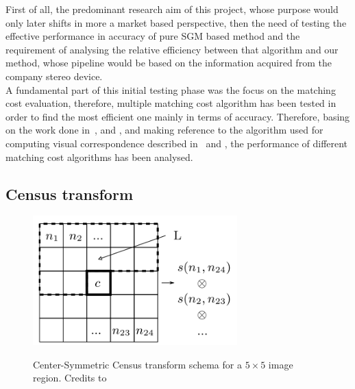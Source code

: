 First of all, the predominant research aim of this project, whose purpose would only later shifts in more a market based perspective, then the need of testing the effective performance in accuracy of pure SGM based method and the requirement of analysing the relative efficiency between that algorithm and our method, whose pipeline would be based on the information acquired from the company stereo device. \\
A fundamental part of this initial testing phase was the focus on the matching cost evaluation, therefore, multiple matching cost algorithm has been tested in order to find the most efficient one mainly in terms of accuracy. 
Therefore, basing on the work done in~\cite{Hirschmuller2007}, \cite{Patil2013} and \cite{Ko2017}, and making reference to the algorithm used for computing visual correspondence described in~\cite{Zabih1994} and \cite{Demetz2013}, the performance of different matching cost algorithms has been analysed.

\subsection{Census transform}
\label{subsection:census-transform}

\begin{figure}[t]
	\begin{center}
	{\includegraphics[width=.8\textwidth, height= 5cm, keepaspectratio]{images/center-symmetric-census.png}}
\caption{Center-Symmetric Census transform schema for a $5 \times 5$ image region. Credits to~\cite{Spangenberg2013}}
\label{fig:center-symmetric-census-schema}
	\end{center}
\end{figure}

